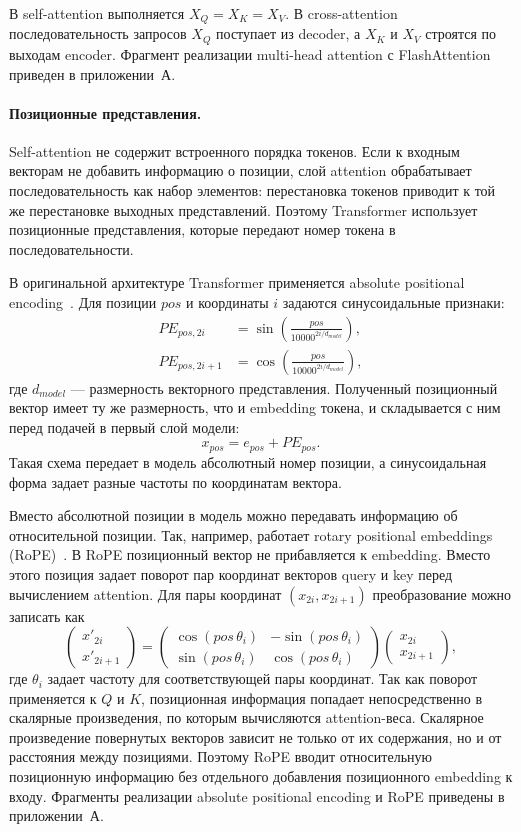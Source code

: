 В self-attention выполняется $X_Q = X_K = X_V$.
В cross-attention последовательность запросов $X_Q$ поступает из decoder, а $X_K$ и $X_V$ строятся по выходам encoder. Фрагмент реализации multi-head attention с FlashAttention приведен в приложении~А.

\paragraph{Позиционные представления.}
Self-attention не содержит встроенного порядка токенов. Если к входным векторам не добавить информацию о позиции, слой attention обрабатывает последовательность как набор элементов: перестановка токенов приводит к той же перестановке выходных представлений. Поэтому Transformer использует позиционные представления, которые передают номер токена в последовательности.

В оригинальной архитектуре Transformer применяется absolute positional encoding~\cite{transformer}. Для позиции $pos$ и координаты $i$ задаются синусоидальные признаки:
\[
	\begin{aligned}
		PE_{pos,2i}   & = \sin\left(\frac{pos}{10000^{2i/d_{model}}}\right), \\
		PE_{pos,2i+1} & = \cos\left(\frac{pos}{10000^{2i/d_{model}}}\right),
	\end{aligned}
\]
где $d_{model}$ --- размерность векторного представления.
Полученный позиционный вектор имеет ту же размерность, что и embedding токена, и складывается с ним перед подачей в первый слой модели:
\[
	x_{pos} = e_{pos} + PE_{pos}.
\]
Такая схема передает в модель абсолютный номер позиции, а синусоидальная форма задает разные частоты по координатам вектора.

Вместо абсолютной позиции в модель можно передавать информацию об относительной позиции. Так, например, работает rotary positional embeddings (RoPE)~\cite{rope}. В RoPE позиционный вектор не прибавляется к embedding. Вместо этого позиция задает поворот пар координат векторов query и key перед вычислением attention. Для пары координат $(x_{2i}, x_{2i+1})$ преобразование можно записать как
\[
	\begin{pmatrix}
		x'_{2i} \\
		x'_{2i+1}
	\end{pmatrix}
	=
	\begin{pmatrix}
		\cos(pos\,\theta_i) & -\sin(pos\,\theta_i) \\
		\sin(pos\,\theta_i) & \cos(pos\,\theta_i)
	\end{pmatrix}
	\begin{pmatrix}
		x_{2i} \\
		x_{2i+1}
	\end{pmatrix},
\]
где $\theta_i$ задает частоту для соответствующей пары координат.
Так как поворот применяется к $Q$ и $K$, позиционная информация попадает непосредственно в скалярные произведения, по которым вычисляются attention-веса.
Скалярное произведение повернутых векторов зависит не только от их содержания, но и от расстояния между позициями.
Поэтому RoPE вводит относительную позиционную информацию без отдельного добавления позиционного embedding к входу. Фрагменты реализации absolute positional encoding и RoPE приведены в приложении~А.

